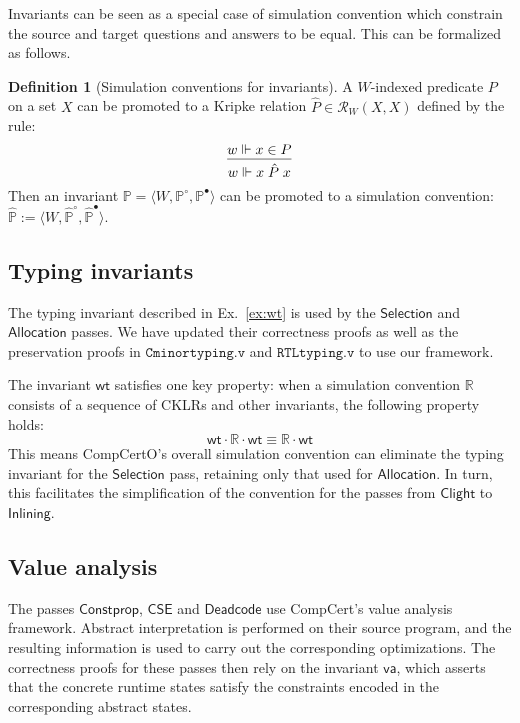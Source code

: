 \documentclass[draft,11pt]{report}
\theoremstyle{definition}
\newtheorem{definition}[theorem]{Definition}
\newcommand{\kw}[1]{\ensuremath{ \mathsf{#1} }}
\newcommand{\que}{\circ}         %
\newcommand{\ans}{\bullet}       %
\begin{document}
Invariants can be seen as a special case of simulation convention
which constrain the source and target questions and answers
to be equal.
This can be formalized as follows.

\begin{definition}[Simulation conventions for invariants]
A $W$-indexed predicate $P$ on a set $X$
can be promoted to a Kripke relation
$\hat{P} \in \mathcal{R}_W(X, X)$
defined by the rule:
\[
  \begin{prooftree}
    \hypo{w \Vdash x \in P}
    \infer1{w \Vdash x \mathrel{\hat{P}} x}
  \end{prooftree}
\]
Then an invariant
$\mathbb{P} = \langle W, \mathbb{P}^\que, \mathbb{P}^\ans \rangle$
can be promoted to a simulation convention:
$\hat{\mathbb{P}} :=
 \langle W, \hat{\mathbb{P}}^\que, \hat{\mathbb{P}}^\ans \rangle$.
\end{definition}


\subsection{Typing invariants} \label{sec:wt} %

The typing invariant described in Ex.~\ref{ex:wt}
is used by the $\kw{Selection}$ and $\kw{Allocation}$ passes.
We have updated their correctness proofs
as well as the preservation proofs in
$\texttt{Cminortyping.v}$ and $\texttt{RTLtyping.v}$
to use our framework.

The invariant $\kw{wt}$ satisfies one key property:
when a simulation convention $\mathbb{R}$
consists of a sequence of CKLRs and other invariants,
the following property holds:
\[
  \kw{wt} \cdot \mathbb{R} \cdot \kw{wt} \equiv
  \mathbb{R} \cdot \kw{wt}
\]
This means CompCertO's overall simulation convention
can eliminate the typing invariant for the $\kw{Selection}$ pass,
retaining only that used for $\kw{Allocation}$.
In turn, this facilitates the simplification of the convention for
the passes from \kw{Clight} to \kw{Inlining}.


\subsection{Value analysis} \label{sec:va} %

The passes
$\kw{Constprop}$, $\kw{CSE}$ and $\kw{Deadcode}$
use CompCert's value analysis framework.
Abstract interpretation is performed %
on their source program,
and the resulting information is used to carry out
the corresponding optimizations.
The correctness proofs for these passes then rely
on the invariant $\kw{va}$,
which asserts that the concrete runtime states
satisfy the constraints encoded in the corresponding
abstract states.
\end{document}
